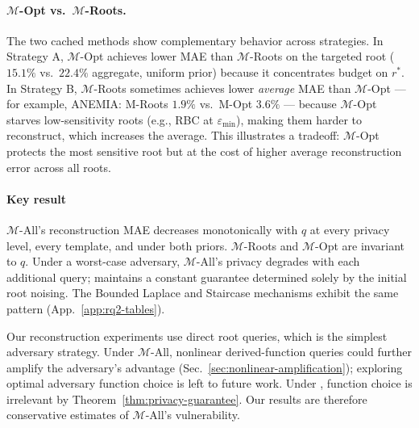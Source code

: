 
\paragraph{$\mathcal{M}$-Opt vs.\ $\mathcal{M}$-Roots.}
The two cached methods show complementary behavior across strategies. In Strategy A, $\mathcal{M}$-Opt achieves lower MAE than $\mathcal{M}$-Roots on the targeted root ($15.1\%$ vs.\ $22.4\%$ aggregate, uniform prior) because it concentrates budget on $r^*$. In Strategy B, $\mathcal{M}$-Roots sometimes achieves lower \emph{average} MAE than $\mathcal{M}$-Opt --- for example, ANEMIA: M-Roots $1.9\%$ vs.\ M-Opt $3.6\%$ --- because $\mathcal{M}$-Opt starves low-sensitivity roots (e.g., RBC at $\varepsilon_{\min}$), making them harder to reconstruct, which increases the average. This illustrates a tradeoff: $\mathcal{M}$-Opt protects the most sensitive root but at the cost of higher average reconstruction error across all roots.

\paragraph{Key result}
$\mathcal{M}$-All's reconstruction MAE decreases monotonically with $q$ at every privacy level, every template, and under both priors. $\mathcal{M}$-Roots and $\mathcal{M}$-Opt are invariant to $q$. Under a worst-case adversary, $\mathcal{M}$-All's privacy degrades with each additional query; \sysname{} maintains a constant guarantee determined solely by the initial root noising. The Bounded Laplace and Staircase mechanisms exhibit the same pattern (App.~\ref{app:rq2-tables}).

Our reconstruction experiments use direct root queries, which is the simplest adversary strategy. Under $\mathcal{M}$-All, nonlinear derived-function queries could further amplify the adversary's advantage (Sec.~\ref{sec:nonlinear-amplification}); exploring optimal adversary function choice is left to future work. Under \sysname{}, function choice is irrelevant by Theorem~\ref{thm:privacy-guarantee}. Our results are therefore conservative estimates of $\mathcal{M}$-All's vulnerability.





